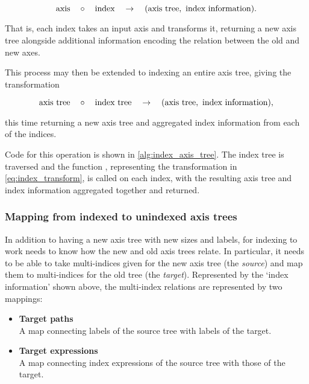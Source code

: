 \documentclass[thesis]{subfiles}
\begin{document}
\begin{equation}
  \textnormal{axis} \quad \circ \quad \textnormal{index} \quad \to \quad (\textnormal{axis tree},\ \textnormal{index information}).
  \label{eq:index_transform}
\end{equation}

\noindent
That is, each index takes an input axis and transforms it, returning a new axis tree alongside additional information encoding the relation between the old and new axes.

This process may then be extended to indexing an entire axis tree, giving the transformation

\begin{equation*}
  \textnormal{axis tree} \quad \circ \quad \textnormal{index tree} \quad \to \quad (\textnormal{axis tree},\ \textnormal{index information}),
\end{equation*}

\noindent
this time returning a new axis tree and aggregated index information from each of the indices.

Code for this operation is shown in \cref{alg:index_axis_tree}.
The index tree is traversed and the function , representing the transformation in \cref{eq:index_transform}, is called on each index, with the resulting axis tree and index information aggregated together and returned.

\subsubsection{Mapping from indexed to unindexed axis trees}

In addition to having a new axis tree with new sizes and labels, for indexing to work  needs to know how the new and old axis trees relate.
In particular, it needs to be able to take multi-indices given for the new axis tree (the \emph{source}) and map them to multi-indices for the old tree (the \emph{target}).
Represented by the `index information' shown above, the multi-index relations are represented by two mappings:

\begin{itemize}
  \item
    \textbf{Target paths} \\
    A map connecting labels of the source tree with labels of the target.
  \item
    \textbf{Target expressions} \\
    A map connecting index expressions of the source tree with those of the target.
\end{itemize}
\end{document}
